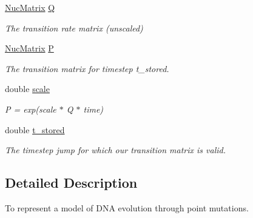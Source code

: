 \begin{DoxyCompactItemize}
\item 
\mbox{\label{classretrocombinator_1_1PointMutationModel_a3f52ae4a94cb8a8cf75113f8b4a7a570}} 
\hyperlink{namespaceretrocombinator_a47bcd6dd938a6f8e34b0996d940f81ef}{Nuc\+Matrix} \hyperlink{classretrocombinator_1_1PointMutationModel_a3f52ae4a94cb8a8cf75113f8b4a7a570}{Q}
\begin{DoxyCompactList}\small\item\em The transition rate matrix (unscaled) \end{DoxyCompactList}\item 
\mbox{\label{classretrocombinator_1_1PointMutationModel_a3717e58e2be7cbfebffea2081dcf9663}} 
\hyperlink{namespaceretrocombinator_a47bcd6dd938a6f8e34b0996d940f81ef}{Nuc\+Matrix} \hyperlink{classretrocombinator_1_1PointMutationModel_a3717e58e2be7cbfebffea2081dcf9663}{P}
\begin{DoxyCompactList}\small\item\em The transition matrix for timestep {\itshape t\+\_\+stored}. \end{DoxyCompactList}\item 
\mbox{\label{classretrocombinator_1_1PointMutationModel_a3258dfbdae0f2614cdc66f13ae028b46}} 
double \hyperlink{classretrocombinator_1_1PointMutationModel_a3258dfbdae0f2614cdc66f13ae028b46}{scale}
\begin{DoxyCompactList}\small\item\em P = exp(scale $\ast$ Q $\ast$ time) \end{DoxyCompactList}\item 
\mbox{\label{classretrocombinator_1_1PointMutationModel_a677f67cf3336af8aa105e60ee991bd13}} 
double \hyperlink{classretrocombinator_1_1PointMutationModel_a677f67cf3336af8aa105e60ee991bd13}{t\+\_\+stored}
\begin{DoxyCompactList}\small\item\em The timestep jump for which our transition matrix is valid. \end{DoxyCompactList}\end{DoxyCompactItemize}


\subsection{Detailed Description}
To represent a model of D\+NA evolution through point mutations. 

